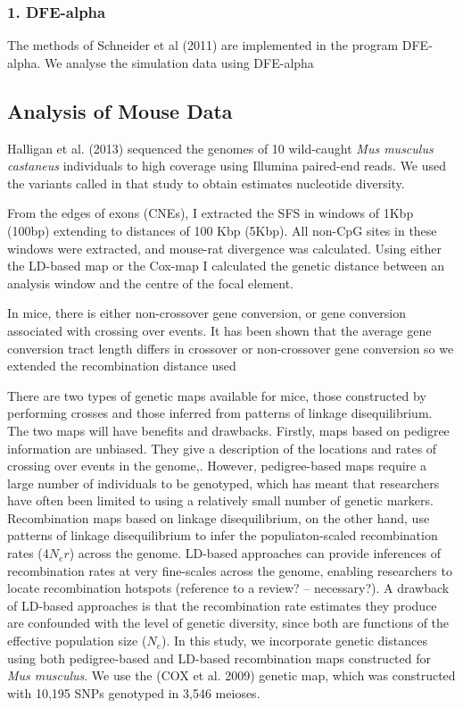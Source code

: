 \documentclass{article}
\begin{document}
		\subsubsection*{1. DFE-alpha}
		The methods of Schneider et al (2011) are implemented in the program DFE-alpha. We analyse the simulation data using DFE-alpha

	\subsection*{Analysis of Mouse Data}

Halligan et al. (2013) sequenced the genomes of 10 wild-caught \emph{Mus musculus castaneus} individuals to high coverage using Illumina paired-end reads. We used the variants called in that study to obtain estimates nucleotide diversity.

From the edges of exons (CNEs), I extracted the SFS in windows of 1Kbp (100bp) extending to distances of 100 Kbp (5Kbp). All non-CpG sites in these windows were extracted, and mouse-rat divergence was calculated. Using either the LD-based map or the Cox-map I calculated the genetic distance between an analysis window and the centre of the focal element. 

	In mice, there is either non-crossover gene conversion, or gene conversion associated with crossing over events. It has been shown that the average gene conversion tract length differs in crossover or non-crossover gene conversion so we extended the recombination distance used 

	There are two types of genetic maps available for mice, those constructed by performing crosses and those inferred from patterns of linkage disequilibrium. The two maps will have benefits and drawbacks. Firstly, maps based on pedigree information are unbiased. They give a description of the locations and rates of crossing over events in the genome,. However, pedigree-based maps require a large number of individuals to be genotyped, which has meant that researchers have often been limited to using a relatively small number of genetic markers. Recombination maps based on linkage disequilibrium, on the other hand, use patterns of linkage disequilibrium to infer the populiaton-scaled recombination rates ($4N_er$) across the genome. LD-based approaches can provide inferences of recombination rates at very fine-scales across the genome, enabling researchers to locate recombination hotspots (reference to a review? – necessary?). A drawback of LD-based approaches is that the recombination rate estimates they produce are confounded with the level of genetic diversity, since both are functions of the effective population size ($N_e$). In this study, we incorporate genetic distances using both pedigree-based and LD-based recombination maps constructed for \emph{Mus musculus}. We use the (COX et al. 2009) genetic map, which was constructed with 10,195 SNPs genotyped in 3,546 meioses. 
\end{document}
